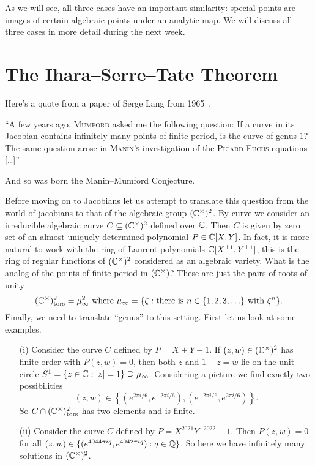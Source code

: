 As we will see, all three cases have an important similarity: special
points are images of certain algebraic points under an analytic map.
We will discuss all three cases in more detail during the next week. 

\section{The Ihara--Serre--Tate Theorem}

Here's a quote from a paper of Serge Lang from
1965~\cite{Lang:Division}.

\begin{displayquote}
  ``A few years ago, \textsc{Mumford} asked me the following question:
  If a curve in its Jacobian contains infinitely many points of finite
  period, is the curve of genus $1$? The same question arose in
  \textsc{Manin's} investigation of the \textsc{Picard-Fuchs}
  equations [\ldots]''
\end{displayquote}
And so was born the Manin--Mumford Conjecture.

Before moving on to Jacobians let us attempt to translate this question
from the world of jacobians to that  of the algebraic group $({\mathbb{C}}^\times)^2$. By
curve we consider an irreducible algebraic curve $C\subseteq
({\mathbb{C}}^\times)^2$ defined over ${\mathbb{C}}$. Then $C$ is given by zero set of
an almost uniquely determined polynomial $P\in {\mathbb{C}}[X,Y]$.
In fact, it is more natural to work with the ring of
Laurent polynomials ${\mathbb{C}}[X^{\pm 1},Y^{\pm 1}]$, this is the ring of
regular functions of $({\mathbb{C}}^\times)^2$ considered as an algebraic
variety.
What is the analog of the points of finite period in $({\mathbb{C}}^\times)$?
These are just the pairs of roots of unity
$$ ({\mathbb{C}}^\times)^2_{\mathrm{tors}}= \mu_\infty^2  \text{ where
}\mu_\infty = \{\zeta : \text{there is $n\in\{1,2,3,\ldots\}$
  with }\zeta^n \}.$$
Finally, we need to translate ``genus'' to this setting. First let us
look at some examples.

\begin{example}
  \begin{itemize}
  \item [(i)] Consider the curve $C$ defined by $P = X+Y-1$. If
    $(z,w)\in({\mathbb{C}}^\times)^2$ has finite order with $P(z,w)=0$, then
    both $z$ and $1-z=w$ lie on the unit circle $S^1= \{z\in{\mathbb{C}} :
    |z|=1\}\supseteq\mu_\infty$. 
    Considering a picture we find exactly two possibilities    
    $$
    (z,w) \in \left\{ (e^{2\pi i/6},e^{-2\pi i/6}),(e^{-2\pi
        i/6},e^{2\pi i/6})\right\}.
    $$
    So $C\cap ({\mathbb{C}}^\times)^2_{\mathrm{tors}}$ has two elements and is
    finite.

  \item[(ii)] Consider the curve $C$ defined by
    $P=X^{2021}Y^{-2022}-1$. Then
    $P(z,w)=0$ for all $(z,w)\in \{(e^{4044\pi iq},e^{4042\pi i
      q}) : q\in{\mathbb{Q}}\}$.
    So here we have infinitely many solutions in $({\mathbb{C}}^\times)^2$.
  \end{itemize}
\end{example}

